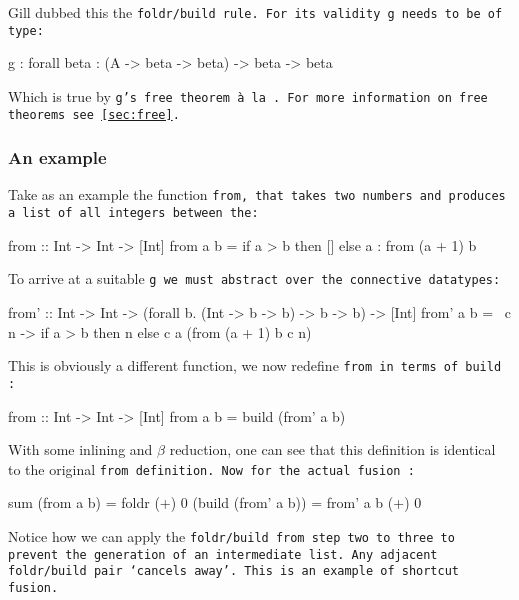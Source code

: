 Gill dubbed this the \tt{foldr/build} rule. For its validity \tt{g} needs to be of type:
\begin{code}
g : forall beta : (A -> beta -> beta) -> beta -> beta
\end{code}
Which is true by \tt{g}'s free theorem \`a la \cite{Wadler1989}. For more information on free theorems see \autoref{sec:free}.

\subsubsection{An example}
Take as an example the function \tt{from}, that takes two numbers and produces a list of all integers between the:
\begin{code}
from :: Int -> Int -> [Int]
from a b = if a > b
           then []
           else a : from (a + 1) b
\end{code}
To arrive at a suitable \tt{g} we must abstract over the connective datatypes:
\begin{code}
from' :: Int -> Int -> (forall b. (Int -> b -> b) -> b -> b) -> [Int] 
from' a b = \ c n  -> if a > b
                      then n
                      else c a (from (a + 1) b c n)
\end{code}
This is obviously a different function, we now redefine \tt{from} in terms of \tt{build} \citep{Gill1993}:
\begin{code}
from :: Int -> Int -> [Int]
from a b = build (from' a b)
\end{code}
With some inlining and $\beta$ reduction, one can see that this definition is identical to the original \tt{from} definition.
Now for the actual fusion \citep{Gill1993}:
\begin{code}
sum (from a b)
  = foldr (+) 0 (build (from' a b))
  = from' a b (+) 0
\end{code}
Notice how we can apply the \tt{foldr/build} from step two to three to prevent the generation of an intermediate list.
Any adjacent \tt{foldr/build} pair `cancels away'.
This is an example of shortcut fusion.

